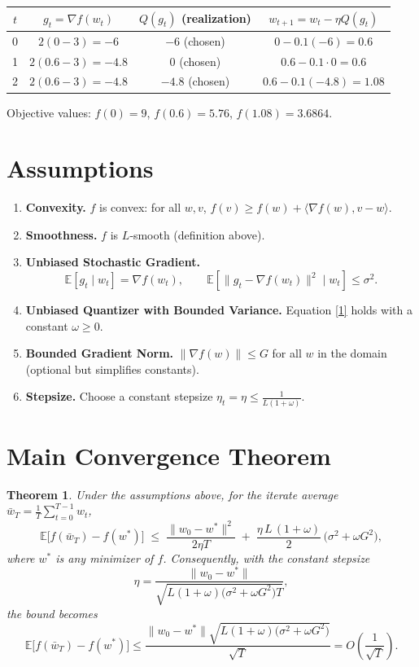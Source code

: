 \documentclass{article}
\newtheorem{theorem}{Theorem}
\newcommand{\E}{\mathbb{E}}
\begin{document}
\begin{center}
\begin{tabular}{c|c|c|c}
$t$ & $g_t= \nabla f(w_t)$ & $Q(g_t)$ (realization) & $w_{t+1}=w_t-\eta Q(g_t)$ \\ \hline
0 & $2(0-3)=-6$ & $-6$ (chosen) & $0-0.1(-6)=0.6$ \\
1 & $2(0.6-3)=-4.8$ & $0$ (chosen) & $0.6-0.1\cdot0=0.6$ \\
2 & $2(0.6-3)=-4.8$ & $-4.8$ (chosen) & $0.6-0.1(-4.8)=1.08$
\end{tabular}
\end{center}

Objective values: $f(0)=9$, $f(0.6)=5.76$, $f(1.08)=3.6864$.

\newpage

\section*{Assumptions}
\begin{enumerate}
\item \textbf{Convexity.} $f$ is convex: for all $w,v$, $f(v)\ge f(w)+\langle\nabla f(w),v-w\rangle$.
\item \textbf{Smoothness.} $f$ is $L$‑smooth (definition above).
\item \textbf{Unbiased Stochastic Gradient.}
\[
\E[g_t\mid w_t]=\nabla f(w_t),\qquad 
\E\!\left[\|g_t-\nabla f(w_t)\|^{2}\mid w_t\right]\le\sigma^{2}.
\]
\item \textbf{Unbiased Quantizer with Bounded Variance.} Equation \eqref{1} holds with a constant $\omega\ge0$.
\item \textbf{Bounded Gradient Norm.} $\| \nabla f(w)\|\le G$ for all $w$ in the domain (optional but simplifies constants).
\item \textbf{Stepsize.} Choose a constant stepsize $\eta_t=\eta\le \frac{1}{L(1+\omega)}$.
\end{enumerate}

\section*{Main Convergence Theorem}
\begin{theorem}
\label{thm:main}
Under the assumptions above, for the iterate average $\bar w_T=\frac{1}{T}\sum_{t=0}^{T-1}w_t$,
\[
\E\!\big[f(\bar w_T)-f(w^{*})\big]
\;\le\;
\frac{\|w_{0}-w^{*}\|^{2}}{2\eta T}
\;+\;
\frac{\eta\,L\,(1+\omega)}{2}\,\big(\sigma^{2}+ \omega G^{2}\big),
\tag{3}
\]
where $w^{*}$ is any minimizer of $f$.
Consequently, with the constant stepsize 
\[
\eta = \frac{\|w_{0}-w^{*}\|}{\sqrt{L(1+\omega)\big(\sigma^{2}+ \omega G^{2}\big) T}},
\]
the bound becomes 
\[
\E\!\big[f(\bar w_T)-f(w^{*})\big]\le
\frac{\|w_{0}-w^{*}\|\sqrt{L(1+\omega)\big(\sigma^{2}+ \omega G^{2}\big)}}{\sqrt{T}}
=O\!\left(\frac{1}{\sqrt{T}}\right).
\tag{4}
\]
\end{theorem}
\end{document}
